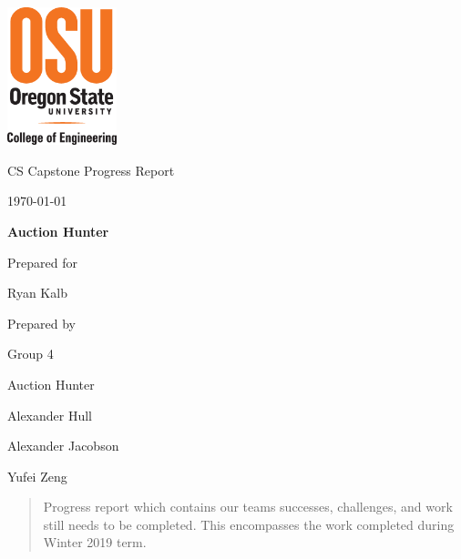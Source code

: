 \documentclass[onecolumn, draftclsnofoot,10pt, compsoc]{IEEEtran}
\def \CapstoneTeamName{		Auction Hunter}
\def \CapstoneTeamNumber{		4}
\def \GroupMemberOne{			Alexander Hull}
\def \GroupMemberTwo{			Alexander Jacobson}
\def \GroupMemberThree{			Yufei Zeng}
\def \CapstoneProjectName{		Auction Hunter}
\def \CapstoneSponsorCompany{	}
\def \CapstoneSponsorPerson{		Ryan Kalb}
\def \DocType{		%
				Progress Report
				}
\newcommand{\NameSigPair}[1]{\par
\makebox[2.75in][r]{#1} \hfil 	\makebox[3.25in]{\makebox[2.25in]{\hrulefill} \hfill		\makebox[.75in]{\hrulefill}}
\par\vspace{-12pt} \textit{\tiny\noindent
\makebox[2.75in]{} \hfil		\makebox[3.25in]{\makebox[2.25in][r]{Signature} \hfill	\makebox[.75in][r]{Date}}}}
\renewcommand{\NameSigPair}[1]{#1}
\begin{document}
\begin{titlepage}
    \begin{singlespace}
    	\includegraphics[height=4cm]{coe_v_spot1}
        \hfill 
        \par\vspace{.2in}
        \centering
        \scshape{
            \huge CS Capstone \DocType \par
            {\large\today}\par
            \vspace{.5in}
            \textbf{\Huge\CapstoneProjectName}\par
            \vfill
            {\large Prepared for}\par
            \Huge \CapstoneSponsorCompany\par
            \vspace{5pt}
            {\Large\NameSigPair{\CapstoneSponsorPerson}\par}
            {\large Prepared by }\par
            Group\CapstoneTeamNumber\par
            \CapstoneTeamName\par 
            \vspace{5pt}
            {\Large
                \NameSigPair{\GroupMemberOne}\par
                \NameSigPair{\GroupMemberTwo}\par
                \NameSigPair{\GroupMemberThree}\par
            }
            \vspace{20pt}
        }
        \begin{abstract}
        	Progress report which contains our teams successes, challenges, and work still needs to be completed. This encompasses the work completed during Winter 2019 term. 
        \end{abstract}     
    \end{singlespace}
\end{titlepage}
\newpage
{}
\tableofcontents
\clearpage
\end{document}
